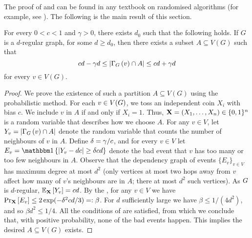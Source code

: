 \documentclass[11pt]{article}
\begin{document}
The proof of  and 
can be found in any textbook on randomised algorithms (for example, see \citep[Chapter 1, Chapter 7]{mitzenmacher2017probability}). The following is the main result of this section. 
\begin{lemma} \label{thm:partition}
For every $0 < c < 1$ and $\gamma> 0$, there exists $d_0$ such that the following holds. If $G$ is a $d$-regular graph, for some $d \ge d_0$, then there exists a subset $A \subseteq V(G)$ such that
$$
    cd - \gamma d \leq \left| \Neighbourhood{G}{v} \cap A \right| \leq cd + \gamma d 
$$
for every $v \in V(G)$.
\end{lemma}
\begin{proof}
We prove the existence of such a partition $A \subseteq V(G)$ using the probabilistic method.
For each $v \in \Vertices{\Graph}$, we toss an independent coin $X_i$ with bias $c$.
We include $v$ in $A$ if and only if $X_i = 1$. Thus, $\vec{X} \Def (X_1, \dots, X_n) \in \bit^n$ is a random variable that describes how we choose $A$. For any $v \in V$, let $Y_v \Def |\Neighbourhood{G}{v} \cap \RedA|$ denote the random variable that counts the number of neighbours of $v$ in $A$.
Define $\delta \Def \gamma / c$, and for every $v \in V$ let $E_v = \Indicator{|Y_v - d c | \geq \delta c d}$ denote the bad event that $v$ has too many or too few neighbours in $A$.
Observe that the dependency graph of events $\{ E_v \}_{v \in V}$ has maximum degree at most $d^2$ (only vertices at most two hops away from $v$ affect how many of $v$'s neighbours are in $A$; there at most $d^2$ such vertices).
As $\Graph$ is $d$-regular, $\Mean{\vec{X}}{Y_v} = c d$. By the , for any $v \in V$ we have $\PProb{E_v}{\vec{X}} \leq 2\exp(-\delta^2c d/3) =: \beta$.
For $d$ sufficiently large we have $\beta \leq 1/(4d^2)$, and so $\beta d^2 \leq 1/4$. All the conditions of  are satisfied, from which we conclude that, with positive probability, none of the bad events happen. This implies the desired $A \subseteq V(G)$ exists.
\end{proof}
\end{document}
